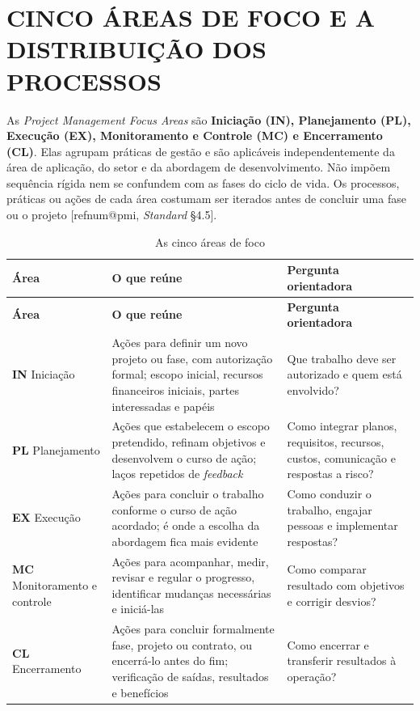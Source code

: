 \documentclass[12pt,a4paper,article,oneside,english,brazil]{abntex2}
\makeatletter
\newcommand{\fontetab}[1]{\par\vspace{3pt}{\small\noindent Fonte: #1\par}}
\newcommand{\refnum}[1]{\csname refnum@#1\endcsname}
\newcommand{\cit}[1]{[\refnum{#1}]}
\makeatother
\begin{document}
\section{CINCO ÁREAS DE FOCO E A DISTRIBUIÇÃO DOS PROCESSOS}

As \textit{Project Management Focus Areas} são \textbf{Iniciação (IN), Planejamento (PL), Execução (EX), Monitoramento e Controle (MC) e Encerramento (CL)}. Elas agrupam práticas de gestão e são aplicáveis independentemente da área de aplicação, do setor e da abordagem de desenvolvimento. Não impõem sequência rígida nem se confundem com as fases do ciclo de vida. Os processos, práticas ou ações de cada área costumam ser iterados antes de concluir uma fase ou o projeto [\refnum{pmi}, \textit{Standard} §4.5].

\begingroup\SingleSpacing\small
\begin{longtable}{@{}>{\raggedright\arraybackslash}p{}>{\raggedright\arraybackslash}p{}>{\raggedright\arraybackslash}p{}@{}}
\caption{As cinco áreas de foco}\label{tab:t6}\\
\hline
\textbf{Área} & \textbf{O que reúne} & \textbf{Pergunta orientadora}\\
\hline
\endfirsthead
\hline
\textbf{Área} & \textbf{O que reúne} & \textbf{Pergunta orientadora}\\
\hline
\endhead
\hline
\endfoot
\hline
\endlastfoot
\textbf{IN} Iniciação & Ações para definir um novo projeto ou fase, com autorização formal; escopo inicial, recursos financeiros iniciais, partes interessadas e papéis & Que trabalho deve ser autorizado e quem está envolvido?\\[3pt]
\textbf{PL} Planejamento & Ações que estabelecem o escopo pretendido, refinam objetivos e desenvolvem o curso de ação; laços repetidos de \textit{feedback} & Como integrar planos, requisitos, recursos, custos, comunicação e respostas a risco?\\[3pt]
\textbf{EX} Execução & Ações para concluir o trabalho conforme o curso de ação acordado; é onde a escolha da abordagem fica mais evidente & Como conduzir o trabalho, engajar pessoas e implementar respostas?\\[3pt]
\textbf{MC} Monitoramento e controle & Ações para acompanhar, medir, revisar e regular o progresso, identificar mudanças necessárias e iniciá-las & Como comparar resultado com objetivos e corrigir desvios?\\[3pt]
\textbf{CL} Encerramento & Ações para concluir formalmente fase, projeto ou contrato, ou encerrá-lo antes do fim; verificação de saídas, resultados e benefícios & Como encerrar e transferir resultados à operação?\\[3pt]
\end{longtable}
\endgroup
\fontetab{Elaborado pelos autores (2026), com base em \cit{pmi}.}
\end{document}
